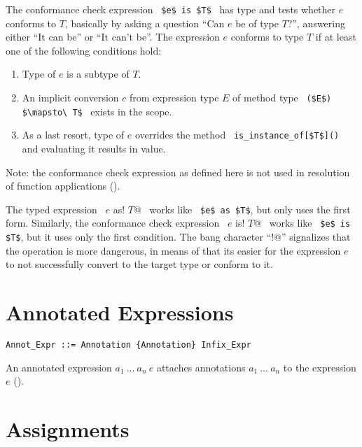 The conformance check expression ~\lstinline!$e$ is $T$!~ has type  and tests whether $e$ conforms to $T$, basically by asking a question ``Can $e$ be of type $T$?'', answering either ``It can be'' or ``It can't be''. The expression $e$ conforms to type $T$ if at least one of the following conditions hold:
\begin{enumerate}
\item Type of $e$ is a subtype of $T$. 
\item An implicit conversion $c$ from expression type $E$ of method type ~\lstinline!($E$) $\mapsto\ T$!~ exists in the scope. 
\item As a last resort, type of $e$ overrides the method ~\lstinline!is_instance_of[$T$]()!~ and evaluating it results in  value. 
\end{enumerate}

Note: the conformance check expression as defined here is not used in resolution of function applications ().

The typed expression ~\lstinline@$e$ as! $T$@~ works like ~\lstinline!$e$ as $T$!, but only uses the first form. Similarly, the conformance check expression ~\lstinline@$e$ is! $T$@~ works like ~\lstinline!$e$ is $T$!, but it uses only the first condition. The bang character ``\lstinline@!@'' signalizes that the operation is more dangerous, in means of that its easier for the expression $e$ to not successfully convert to the target type or conform to it. 






\section{Annotated Expressions}
\label{sec:annotated-exprs}

\syntax\begin{lstlisting}
Annot_Expr ::= Annotation {Annotation} Infix_Expr
\end{lstlisting}

An annotated expression $a_1\ \ldots\ a_n\ e$ attaches annotations $a_1\ \ldots\ a_n$ to the expression $e$ (). 






\section{Assignments}

